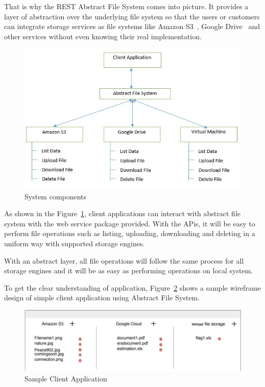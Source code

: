 That is why the REST Abstract File System comes into picture. It
provides a layer of abstraction over the underlying file system so
that the users or customers can integrate storage services as file
systems like Amazon S3~\cite{hid-sp18-420-amazon-S3}, Google
Drive~\cite{hid-sp18-420-google-drive} and other services without even
knowing their real implementation.



\begin{figure}[!ht]
        \centering\includegraphics[width=\columnwidth]
        {image/architecture.JPG}
        \caption{System components}\label{fig:architecture}
\end{figure}


As shown in the Figure~\ref{fig:architecture}, client applications can
interact with abstract file system with the web service package
provided. With the APis, it will be easy to perform file operations
such as listing, uploading, downloading and deleting in a uniform way
with supported storage engines.

With an abstract layer, all file operations will follow the same
process for all storage engines and it will be as easy as performing
operations on local system.


To get the clear understanding of application, Figure~\ref{fig:client} 
shows a sample wireframe 
design of simple client application using Abstract File System. 


\begin{figure}[!ht]
        \centering\includegraphics[width=\columnwidth]
        {image/client.JPG}
        \caption{Sample Client Application}\label{fig:client}
\end{figure}




